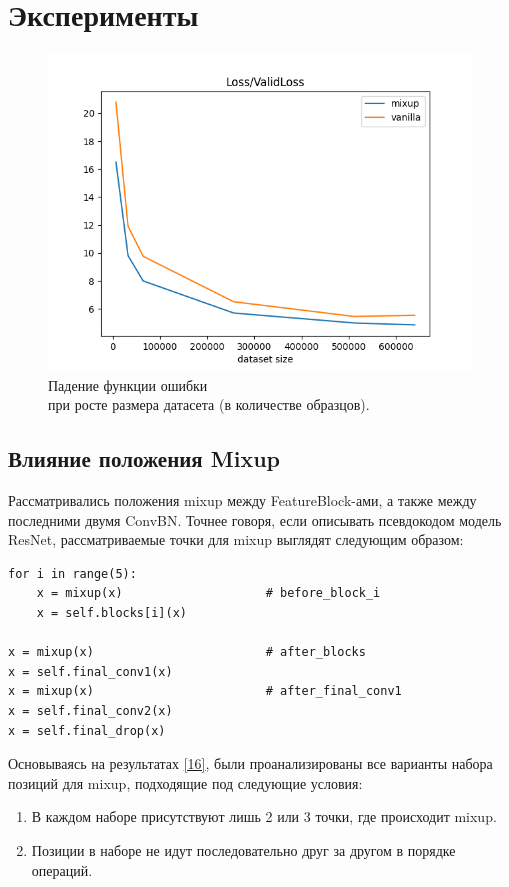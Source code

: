 \section{Эксперименты}
\label{sec:Chapter4} 

\begin{figure}
\centering
\includegraphics[scale=0.75]{./images/mixup_size/all/ValidLoss.png}
\caption{\protect\hypertarget{image13}{Падение функции ошибки \\ при росте размера датасета (в количестве образцов)}.}
\end{figure}

\subsection{Влияние положения Mixup}
Рассматривались положения mixup между FeatureBlock-ами, а также между последними двумя ConvBN. Точнее говоря, если описывать псевдокодом модель ResNet, рассматриваемые точки для mixup выглядят следующим образом:

\begin{lstlisting}
for i in range(5):
    x = mixup(x)                    # before_block_i
    x = self.blocks[i](x)

x = mixup(x)                        # after_blocks
x = self.final_conv1(x)
x = mixup(x)                        # after_final_conv1
x = self.final_conv2(x)
x = self.final_drop(x)
\end{lstlisting}

Основываясь на результатах \hyperlink{cite.Bas19}{[16]}, были проанализированы все варианты набора позиций для mixup, подходящие под следующие условия:
\begin{enumerate}
\item В каждом наборе присутствуют лишь 2 или 3 точки, где происходит mixup.
\item Позиции в наборе не идут последовательно друг за другом в порядке операций.
\end{enumerate}

